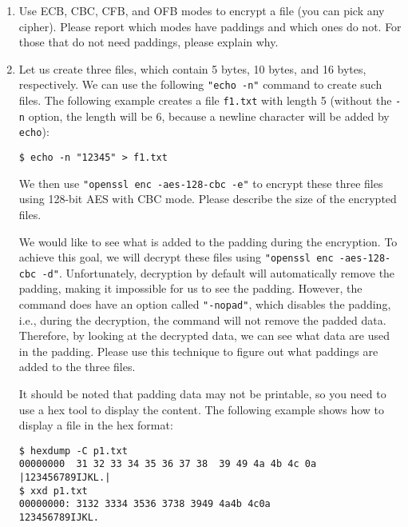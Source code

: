 \begin{enumerate}
\item Use ECB, CBC, CFB, and OFB modes to encrypt a file (you can pick
any cipher).  Please report which modes have paddings and which ones
do not. For those that do not need paddings, please explain why.


\item Let us create three files, which contain 5 bytes, 10 bytes, and 16 bytes, respectively.
We can use the following \texttt{"echo -n"} command to create such files. The following example
creates a file \texttt{f1.txt} with length 5 (without the \texttt{-n} option, the length will
be 6, because a newline character will be added by \texttt{echo}):

\begin{lstlisting}
$ echo -n "12345" > f1.txt
\end{lstlisting}

We then use \texttt{"openssl enc -aes-128-cbc -e"} to encrypt these three files using
128-bit AES with CBC mode.  Please describe
the size of the encrypted files.

We would like to see what is added to the padding during the encryption. To achieve
this goal, we will decrypt these files using \texttt{"openssl enc -aes-128-cbc -d"}.
Unfortunately, decryption by default will automatically remove the padding, making it
impossible for us to see the padding. However, the command does have an option called
\texttt{"-nopad"}, which disables the padding, i.e., during the decryption, the command will not
remove the padded data. Therefore, by looking at the decrypted
data, we can see what data are used in the padding.
Please use this technique to figure out what paddings are added to the three files.

It should be noted that padding data may not be printable, so you need to
use a hex tool to display the content. The following example shows
how to display a file in the hex format:

\begin{lstlisting}
$ hexdump -C p1.txt
00000000  31 32 33 34 35 36 37 38  39 49 4a 4b 4c 0a   |123456789IJKL.|
$ xxd p1.txt
00000000: 3132 3334 3536 3738 3949 4a4b 4c0a            123456789IJKL.
\end{lstlisting}

\end{enumerate}



